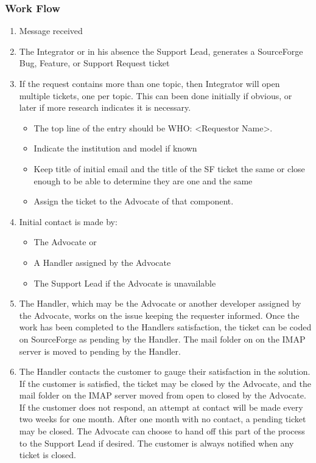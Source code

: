 \subsubsection{Work Flow}
\begin{enumerate}
\item Message received
\item The Integrator or in his absence the Support Lead, generates a SourceForge Bug, Feature, or Support Request ticket
\item If the request contains more than one topic, then Integrator will open multiple tickets, one per topic. This can been done
initially if obvious, or later if more research indicates it is necessary. 

\begin{itemize}
\item The top line of the entry should be WHO: <Requestor Name>.
\item Indicate the institution and model if known
\item Keep title of initial email and the title of the SF ticket the
same or close enough to be able to determine they are one and the same
\item Assign the ticket to the Advocate of that component. 
\end{itemize}

\item Initial contact is made by:

\begin{itemize}
\item The Advocate or
\item A Handler assigned by the Advocate
\item The Support Lead if the Advocate is unavailable
\end{itemize}

\item The Handler, which may be the Advocate or another developer assigned by the Advocate, works on the issue keeping the requester informed. Once the work has been completed to the Handlers satisfaction, the ticket can be coded on SourceForge as pending by the Handler.  The mail folder on 
on the IMAP server is moved to pending by the Handler.

\item The Handler contacts the customer to gauge their satisfaction in the solution. If the customer is satisfied, the ticket may be closed by the Advocate, and the mail folder on the IMAP server moved from open to 
closed by the Advocate.  If the customer does not respond, an attempt at contact will be made every two weeks for one month.  After one month with no contact, a pending ticket may be closed.  The Advocate can choose to hand off this part of the process to the Support Lead if desired.  The customer is always notified when any ticket is closed. 


\end{enumerate}
